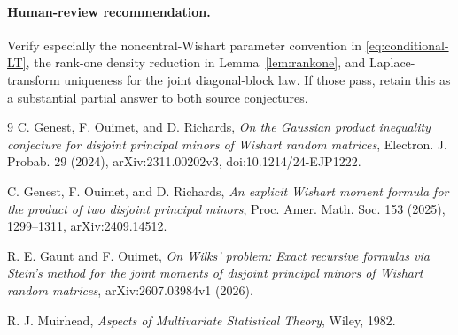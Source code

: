 \documentclass[11pt]{article}
\begin{document}
\paragraph{Human-review recommendation.}
Verify especially the noncentral-Wishart parameter convention in
\eqref{eq:conditional-LT}, the rank-one density reduction in
Lemma~\ref{lem:rankone}, and Laplace-transform uniqueness for the joint
diagonal-block law.  If those pass, retain this as a substantial partial
answer to both source conjectures.

\begin{thebibliography}{9}
C. Genest, F. Ouimet, and D. Richards,
\emph{On the Gaussian product inequality conjecture for disjoint principal
minors of Wishart random matrices},
Electron. J. Probab. 29 (2024), arXiv:2311.00202v3,
doi:10.1214/24-EJP1222.

C. Genest, F. Ouimet, and D. Richards,
\emph{An explicit Wishart moment formula for the product of two disjoint
principal minors},
Proc. Amer. Math. Soc. 153 (2025), 1299--1311,
arXiv:2409.14512.

R. E. Gaunt and F. Ouimet,
\emph{On Wilks' problem: Exact recursive formulas via Stein's method for the
joint moments of disjoint principal minors of Wishart random matrices},
arXiv:2607.03984v1 (2026).

R. J. Muirhead,
\emph{Aspects of Multivariate Statistical Theory},
Wiley, 1982.
\end{thebibliography}
\end{document}

